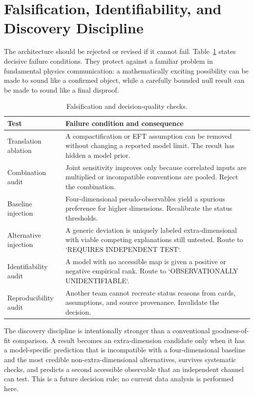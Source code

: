 \documentclass[conference]{IEEEtran}
\begin{document}
\section{Falsification, Identifiability, and Discovery Discipline}

The architecture should be rejected or revised if it cannot fail. Table~\ref{tab:falsify} states decisive failure conditions. They protect against a familiar problem in fundamental physics communication: a mathematically exciting possibility can be made to sound like a confirmed object, while a carefully bounded null result can be made to sound like a final disproof.

\begin{table}[t]
\caption{Falsification and decision-quality checks.}
\label{tab:falsify}
\centering
\footnotesize
\setlength{\tabcolsep}{2.5pt}
\begin{tabular}{p{} p{}}
\toprule
\textbf{Test} & \textbf{Failure condition and consequence} \\
\midrule
Translation ablation & A compactification or EFT assumption can be removed without changing a reported model limit. The result has hidden a model prior. \\
Combination audit & Joint sensitivity improves only because correlated inputs are multiplied or incompatible conventions are pooled. Reject the combination. \\
Baseline injection & Four-dimensional pseudo-observables yield a spurious preference for higher dimensions. Recalibrate the status thresholds. \\
Alternative injection & A generic deviation is uniquely labeled extra-dimensional with viable competing explanations still untested. Route to `REQUIRES INDEPENDENT TEST`. \\
Identifiability audit & A model with no accessible map is given a positive or negative empirical rank. Route to `OBSERVATIONALLY UNIDENTIFIABLE`. \\
Reproducibility audit & Another team cannot recreate status reasons from cards, assumptions, and source provenance. Invalidate the decision. \\
\bottomrule
\end{tabular}
\end{table}

The discovery discipline is intentionally stronger than a conventional goodness-of-fit comparison. A result becomes an extra-dimension candidate only when it has a model-specific prediction that is incompatible with a four-dimensional baseline and the most credible non-extra-dimensional alternatives, survives systematic checks, and predicts a second accessible observable that an independent channel can test. This is a future decision rule; no current data analysis is performed here.
\end{document}
